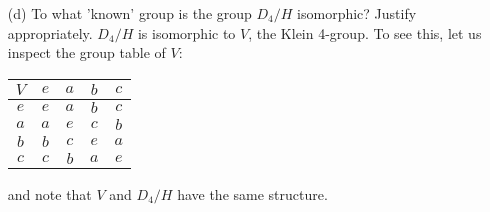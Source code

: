 \documentclass{article}
\begin{document}
\begin{enumerate}
    \item[(d)] To what 'known' group is the group $D_4/H$ isomorphic? Justify appropriately.
    \newline\newline
    $D_4/H$ is isomorphic to $V$, the Klein 4-group. To see this, let us inspect the group table of $V$:
    \begin{center}
        \begin{tabular}{c||c|c|c|c}
            $V$ & $e$ & $a$ & $b$ & $c$ \\
             \hline\hline
            $e$ & $e$ & $a$ & $b$ & $c$ \\
            \hline
            $a$ & $a$ & $e$ & $c$ & $b$ \\
            \hline
            $b$ & $b$ & $c$ & $e$ & $a$ \\
            \hline
            $c$ & $c$ & $b$ & $a$ & $e$ \\
        \end{tabular}
    \end{center}
    and note that $V$ and $D_4/H$ have the same structure.
    
\end{enumerate}
\end{document}
